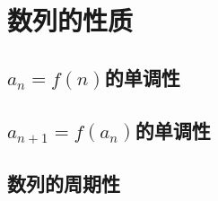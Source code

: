 \section{数列的性质}

\subsection{\texorpdfstring{$a_n=f(n)$}s的单调性}
\clearpage
\subsection{\texorpdfstring{$a_{n+1}=f(a_n)$}s的单调性}
\clearpage
\subsection{数列的周期性}
\clearpage
